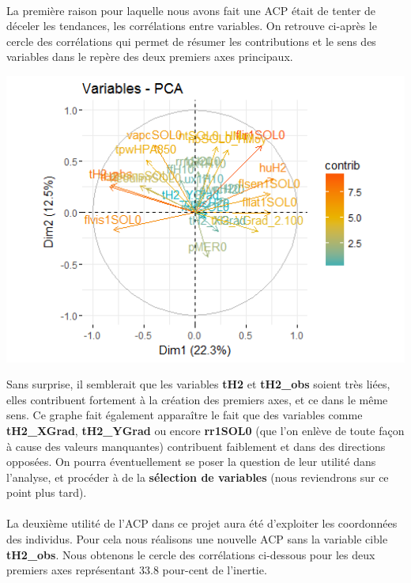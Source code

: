 \documentclass[14pt, openany]{article}
\begin{document}
\paragraph{}
La première raison pour laquelle nous avons fait une ACP était de tenter de déceler les tendances, les corrélations entre variables. On retrouve ci-après le cercle des corrélations qui permet de résumer les contributions et le sens des variables dans le repère des deux premiers axes principaux.
\begin{center}
\includegraphics[width=18cm]{Images/ACP.png}
\end{center}
Sans surprise, il semblerait que les variables \textbf{tH2} et \textbf{tH2\_obs} soient très liées, elles contribuent fortement à la création des premiers axes, et ce dans le même sens. Ce graphe fait également apparaître le fait que des variables comme \textbf{tH2\_XGrad}, \textbf{tH2\_YGrad} ou encore \textbf{rr1SOL0} (que l'on enlève de toute façon à cause des valeurs manquantes) contribuent faiblement et dans des directions opposées. On pourra éventuellement se poser la question de leur utilité dans l'analyse, et procéder à de la \textbf{sélection de variables} (nous reviendrons sur ce point plus tard).

\paragraph{}
La deuxième utilité de l'ACP dans ce projet aura été d'exploiter les coordonnées des individus. Pour cela nous réalisons une nouvelle ACP sans la variable cible \textbf{tH2\_obs}. Nous obtenons le cercle des corrélations ci-dessous pour les deux premiers axes représentant $33.8$ pour-cent de l'inertie.
\end{document}
